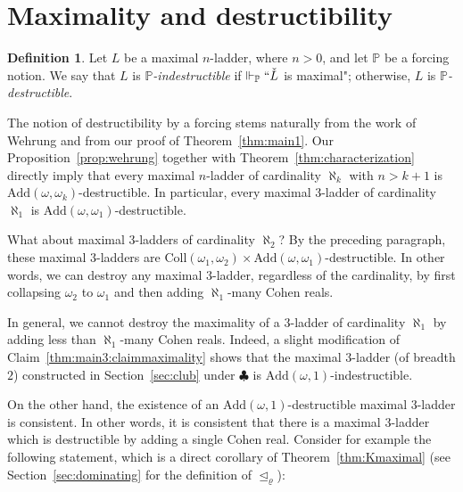 \documentclass[]{amsart}
\theoremstyle{definition}
\newtheorem{definition}[theorem]{Definition}
\theoremstyle{remark}
\begin{document}
\section{Maximality and destructibility}\label{sec:diamond}

\begin{definition}
Let $L$ be a maximal $n$-ladder, where $n > 0$, and let $\mathbb{P}$ be a forcing notion. We say that $L$ is \emph{$\mathbb{P}$-indestructible} if $\Vdash_\mathbb{P} ``\check{L}$ is maximal"; otherwise, $L$ is \emph{$\mathbb{P}$-destructible}.
\end{definition}

The notion of destructibility by a forcing stems naturally from the work of Wehrung \cite{MR2609217} and from our proof of Theorem~\ref{thm:main1}. Our Proposition~\ref{prop:wehrung} together with Theorem~\ref{thm:characterization} directly imply that every maximal $n$-ladder of cardinality $\aleph_k$ with $n > k+1$ is $\text{Add}(\omega, \omega_k)$-destructible. In particular, every maximal $3$-ladder of cardinality $\aleph_1$ is $\text{Add}(\omega, \omega_1)$-destructible. 

What about maximal $3$-ladders of cardinality $\aleph_2$? By the preceding paragraph, these maximal $3$-ladders are $\text{Coll}(\omega_1, \omega_2) \times \text{Add}(\omega, \omega_1)$-destructible. In other words, we can destroy any maximal $3$-ladder, regardless of the cardinality, by first collapsing $\omega_2$ to $\omega_1$ and then adding $\aleph_1$-many Cohen reals. 

In general, we cannot destroy the maximality of a $3$-ladder of cardinality $\aleph_1$ by adding less than $\aleph_1$-many Cohen reals. Indeed, a slight modification of Claim~\ref{thm:main3:claimmaximality} shows that the maximal $3$-ladder (of breadth $2$) constructed in Section~\ref{sec:club} under $\clubsuit$ is $\text{Add}(\omega, 1)$-indestructible. 

On the other hand, the existence of an $\text{Add}(\omega, 1)$-destructible maximal $3$-ladder is consistent. In other words, it is consistent that there is a maximal $3$-ladder which is destructible by adding a single Cohen real. Consider for example the following statement, which is a direct corollary of Theorem~\ref{thm:Kmaximal} (see Section~\ref{sec:dominating} for the definition of $\trianglelefteq_\varrho$):
\end{document}
